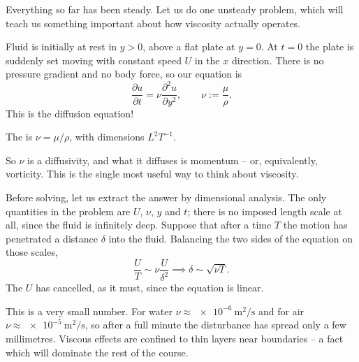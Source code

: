 \documentclass[a4paper]{scrartcl}
\newcommand{\pd}[2]{\frac{\partial #1}{\partial #2}}
\newcommand{\pdd}[2]{\frac{\partial^2 #1}{\partial #2^2}}
\begin{document}
Everything so far has been steady. Let us do one unsteady problem, which will teach us something important about how viscosity actually operates.

\begin{example}
	Fluid is initially at rest in $y > 0$, above a flat plate at $y = 0$. At $t = 0$ the plate is suddenly set moving with constant speed $U$ in the $x$ direction. There is no pressure gradient and no body force, so our equation is
	$$
	\pd{u}{t} = \nu \pdd{u}{y}, \qquad \nu := \frac{\mu}{\rho}.
	$$
	This is the diffusion equation!

	\begin{definition}
		The  is $\nu = \mu / \rho$, with dimensions $L^2 T^{-1}$.
	\end{definition}

	So $\nu$ is a diffusivity, and what it diffuses is momentum -- or, equivalently, vorticity. This is the single most useful way to think about viscosity.

	Before solving, let us extract the answer by dimensional analysis. The only quantities in the problem are $U$, $\nu$, $y$ and $t$; there is no imposed length scale at all, since the fluid is infinitely deep. Suppose that after a time $T$ the motion has penetrated a distance $\delta$ into the fluid. Balancing the two sides of the equation on those scales,
	$$
	\frac{U}{T} \sim \nu \frac{U}{\delta^2} \implies \delta \sim \sqrt{\nu T}.
	$$
	The $U$ has cancelled, as it must, since the equation is linear.

	This is a very small number. For water $\nu \approx \SI{e-6}{\meter\squared\per\second}$ and for air $\nu \approx \SI{e-5}{\meter\squared\per\second}$, so after a full minute the disturbance has spread only a few millimetres. Viscous effects are confined to thin layers near boundaries -- a fact which will dominate the rest of the course.


\end{example}
\end{document}
